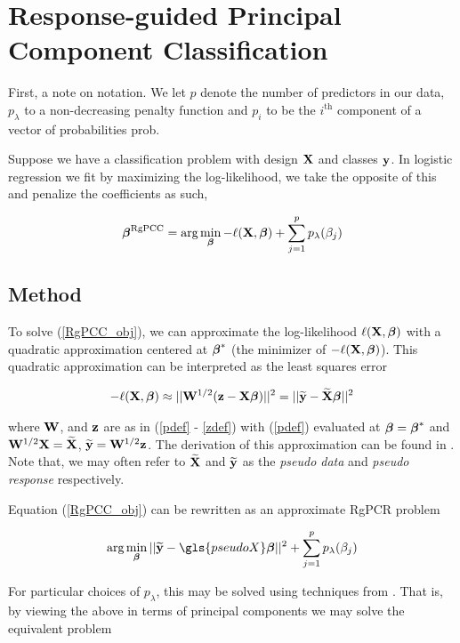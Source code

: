 \documentclass[main.tex]{subfiles}
\begin{document}
\section{Response-guided Principal Component Classification}

First, a note on notation. We let $p$ denote the number of predictors in our data, $p_{\lambda}$ to a non-decreasing penalty function and $p_i$ to be the $i^{\text{th}}$ component of a vector of probabilities \gls{prob}.

Suppose we have a classification problem with design $\mathbf{X}$ and classes $\mathbf{y}$. In logistic regression we fit by maximizing the log-likelihood, we take the opposite of this and penalize the coefficients as such,

\begin{align}
	\boldsymbol \beta^{\text{RgPCC}} = \text{arg} \min_{\boldsymbol \beta} - \ell(\mathbf{X}, \boldsymbol \beta) + \sum_{j = 1}^p p_{\lambda}(\beta_j) \label{RgPCC_obj}
\end{align}

\subsection{Method}
To solve (\ref{RgPCC_obj}), we can approximate the log-likelihood $\ell(\mathbf{X}, \boldsymbol \beta)$ with a quadratic approximation centered at $\boldsymbol \beta^*$ (the minimizer of $- \ell(\mathbf{X}, \boldsymbol \beta)$). This quadratic approximation can be interpreted as the least squares error

\begin{align}
	- \ell(\mathbf{X}, \boldsymbol \beta) \approx ||\mathbf{W}^{1/2} (\mathbf{z} - \mathbf{X} \boldsymbol \beta)||^2 = || \widetilde{\mathbf{y}} - \widetilde{\mathbf{X}} \boldsymbol \beta ||^2
\end{align}

where $\mathbf{W}$, and $\mathbf{z}$ are as in (\ref{pdef} - \ref{zdef}) with (\ref{pdef}) evaluated at $\boldsymbol \beta = \boldsymbol \beta^*$ and $\mathbf{W}^{1/2} \mathbf{X} = \widetilde{\mathbf{X}}$, $\widetilde{\mathbf{y}} = \mathbf{W}^{1/2} \mathbf{z}$. The derivation of this approximation can be found in \cite{wangleng}. Note that, we may often refer to $\widetilde{\mathbf{X}}$ and $\widetilde{\mathbf{y}}$ as the \emph{pseudo data} and \emph{pseudo response} respectively.

Equation (\ref{RgPCC_obj}) can be rewritten as an approximate RgPCR problem

\begin{align}
	\argmin_{\bbeta} || \widetilde{\y} - \gls{pseudoX} \bbeta ||^2 + \sum_{j = 1}^p p_{\lambda}(\beta_j) \label{RgPCC_obj2}
\end{align}

For particular choices of $p_{\lambda}$, this may be solved using techniques from \cite{langzou}. That is, by viewing the above in terms of principal components we may solve the equivalent problem
\end{document}
